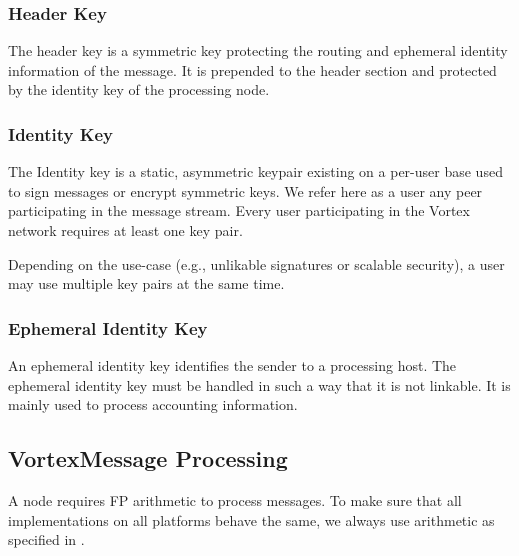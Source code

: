 \subsubsection{Header Key}
The header key is a symmetric key protecting the routing and ephemeral identity information of the message. It is prepended to the header section and protected by the identity key of the processing node.

\subsubsection{Identity Key}
The Identity key is a static, asymmetric keypair existing on a per-user base used to sign messages or encrypt symmetric keys. We refer here as a user any peer participating in the message stream. Every user participating in the Vortex network requires at least one key pair. 

Depending on the use-case (e.g., unlikable signatures or scalable security), a user may use multiple key pairs at the same time.

\subsubsection{Ephemeral Identity Key}
An ephemeral identity key identifies the sender to a processing host. The ephemeral identity key must be handled in such a way that it is not linkable. It is mainly used to process accounting information.

\subsection{VortexMessage Processing}
A node requires FP arithmetic to process messages. To make sure that all implementations on all platforms behave the same, we always use arithmetic as specified in \cite{IEEE754}.

